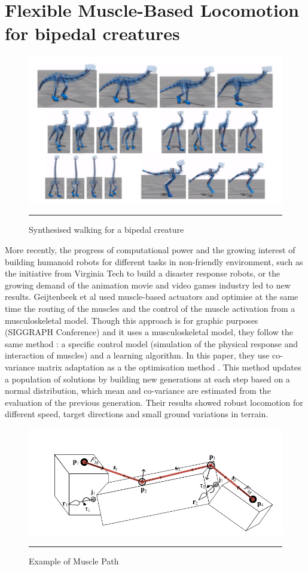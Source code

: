 \section{Flexible Muscle-Based Locomotion for bipedal creatures}

\begin{figure}[htbp]
    \centering
    \includegraphics[scale=0.3]{Figures/synthesized_walking.png}
    \rule{35em}{0.5pt}
    \caption[Synthesised walking for a bipedal creature]{Synthesised walking for a bipedal creature}
    \label{fig:synthesized_walking}
\end{figure}

More recently, the progress of computational power and the growing interest of building humanoid robots for different tasks in non-friendly environment, such as the initiative from Virginia Tech to build a disaster response robots, or the growing demand of the animation movie and video games industry led to new results. Geijtenbeek et al \cite{MuscleBasedBipeds} used muscle-based actuators and optimise at the same time the routing of the muscles and the control of the muscle activation from a musculoskeletal model. Though this approach is for graphic purposes (SIGGRAPH Conference) and it uses a musculoskeletal model, they follow the same method : a specific control model (simulation of the physical response and interaction of muscles) and a learning algorithm. In this paper, they use co-variance matrix adaptation as a the optimisation method \cite{igel2007covariance}. This method updates a population of solutions by building new generations at each step based on a normal distribution, which mean and co-variance are estimated from the evaluation of the previous generation. Their results showed robust locomotion for different speed, target directions and small ground variations in terrain.

\begin{figure}[htbp]
    \centering
    \includegraphics[scale=0.2]{Figures/muscle_based.png}
    \rule{35em}{0.5pt}
    \caption[Example of Muscle Path]{Example of Muscle Path}
    \label{fig:muscle_based}
\end{figure}


